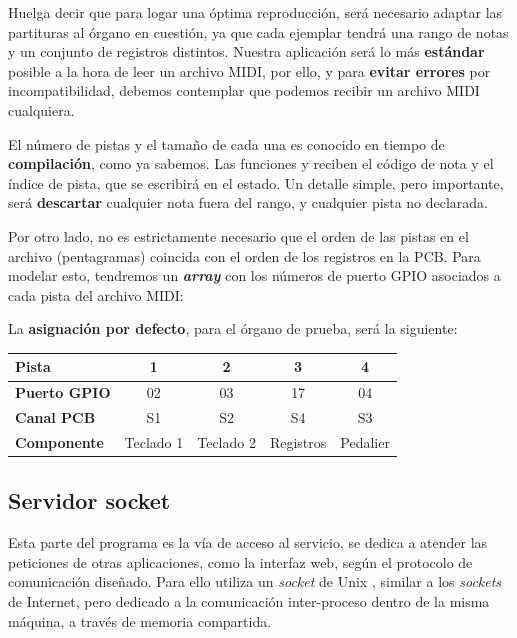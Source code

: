 Huelga decir que para logar una óptima reproducción, será necesario adaptar las partituras al órgano en cuestión, ya que cada ejemplar tendrá una rango de notas y un conjunto de registros distintos. Nuestra aplicación será lo más \textbf{estándar} posible a la hora de leer un archivo \acrshort{MIDI}, por ello, y para \textbf{evitar errores} por incompatibilidad, debemos contemplar que podemos recibir un archivo \acrshort{MIDI} cualquiera.

El número de pistas y el tamaño de cada una es conocido en tiempo de \textbf{compilación}, como ya sabemos. Las funciones  y  reciben el código de nota y el índice de pista, que se escribirá en el estado. Un detalle simple, pero importante, será \textbf{descartar} cualquier nota fuera del rango, y cualquier pista no declarada.

Por otro lado, no es estrictamente necesario que el orden de las pistas en el archivo (pentagramas) coincida con el orden de los registros en la \acrshort{PCB}. Para modelar esto, tendremos un \textbf{\textit{array}} con los números de puerto \acrshort{GPIO} asociados a cada pista del archivo \acrshort{MIDI}:

La \textbf{asignación por defecto}, para el órgano de prueba, será la siguiente:

\smallskip

\begin{center}
	\begin{tabular}{|l|c|c|c|c|}
		\hline \textbf{Pista} & 1 & 2 & 3 & 4 \\
		\hline \textbf{Puerto GPIO} & 02 & 03 & 17 & 04 \\
		\hline \textbf{Canal PCB} & S1 & S2 & S4 & S3 \\
		\hline \textbf{Componente} & Teclado 1 & Teclado 2 & Registros & Pedalier \\
		\hline 
	\end{tabular}
	\smallskip
\end{center}

\smallskip

\subsection{Servidor socket}

Esta parte del programa es la vía de acceso al servicio, se dedica a atender las peticiones de otras aplicaciones, como la interfaz web, según el protocolo de comunicación diseñado. Para ello utiliza un \textit{socket} de Unix \cite{wiki_socket}, similar a los \textit{sockets} de Internet, pero dedicado a la comunicación inter-proceso dentro de la misma máquina, a través de memoria compartida.

